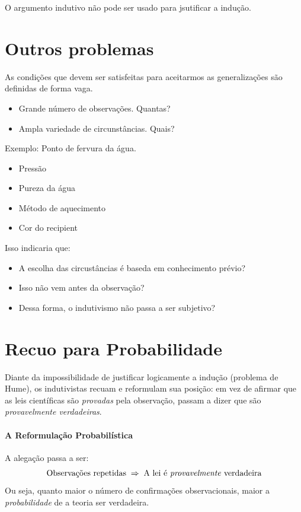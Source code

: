 \documentclass[9pt,a4paper]{extarticle}
\begin{document}
O argumento indutivo não pode ser usado para jsutificar a indução. 

\section{Outros problemas}

As condições que devem ser satisfeitas para aceitarmos as generalizações são definidas de forma vaga.

\begin{itemize}
    \item Grande número de observações. Quantas?
    \item Ampla variedade de circunstâncias. Quais?
\end{itemize}

Exemplo: Ponto de fervura da água. 
\begin{itemize}
    \item Pressão
    \item Pureza da água 
    \item Método de aquecimento
    \item Cor do recipient
\end{itemize}

Isso indicaria que:
\begin{itemize}
    \item A escolha das circustâncias é baseda em conhecimento prévio? 
    \item Isso não vem antes da observação? 
    \item Dessa forma, o indutivismo não passa a ser subjetivo?
\end{itemize}

\section{Recuo para Probabilidade}


Diante da impossibilidade de justificar logicamente a indução (problema de Hume), os indutivistas recuam e reformulam sua posição: em vez de afirmar que as leis científicas são \textit{provadas} pela observação, passam a dizer que são \textit{provavelmente verdadeiras}.

\paragraph{A Reformulação Probabilística}

A alegação passa a ser:
\[
\text{Observações repetidas} \;\Rightarrow\; \text{A lei é \textit{provavelmente} verdadeira}
\]
Ou seja, quanto maior o número de confirmações observacionais, maior a \textit{probabilidade} de a teoria ser verdadeira.
\end{document}
